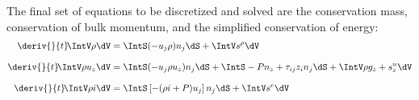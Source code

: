 The final set of equations to be discretized and solved are the conservation mass, conservation of bulk momentum, and the simplified conservation of energy:
\begin{subequations}
    \label{Eqn:TheFinalEquations}
    \begin{align}
        \deriv{}{t}\!\IntV \rho \dV      &= \IntS (-u_j \rho)n_j\dS + \IntV s^\rho\dV \\[0.8em]
        \deriv{}{t}\! \IntV \rho u_z \dV &= \IntS (-u_j \rho u_z) n_j \dS + \IntS - P n_z + \tau_{ij} z_i n_j \dS + \IntV \rho g_z + s^u_z \dV \\[0.8em]
        \deriv{}{t}\! \IntV \rho i \dV   &= \IntS \left[- (\rho{i} + P) u_j\right] n_j\dS + \IntV s^e \dV
    \end{align}
\end{subequations}












